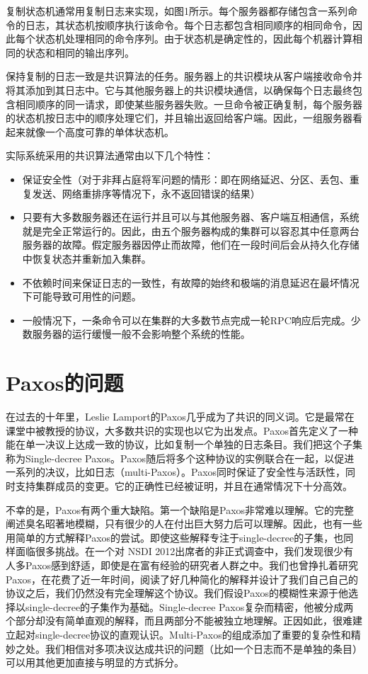 复制状态机通常用复制日志来实现，如图1所示。每个服务器都存储包含一系列命令的日志，其状态机按顺序执行该命令。每个日志都包含相同顺序的相同命令，因此每个状态机处理相同的命令序列。由于状态机是确定性的，因此每个机器计算相同的状态和相同的输出序列。

保持复制的日志一致是共识算法的任务。服务器上的共识模块从客户端接收命令并将其添加到其日志中。它与其他服务器上的共识模块通信，以确保每个日志最终包含相同顺序的同一请求，即使某些服务器失败。一旦命令被正确复制，每个服务器的状态机按日志中的顺序处理它们，并且输出返回给客户端。因此，一组服务器看起来就像一个高度可靠的单体状态机。

实际系统采用的共识算法通常由以下几个特性：

\begin{itemize}
    \item 保证安全性（对于非拜占庭将军问题的情形：即在网络延迟、分区、丢包、重复发送、网络重排序等情况下，永不返回错误的结果）
    \item 只要有大多数服务器还在运行并且可以与其他服务器、客户端互相通信，系统就是完全正常运行的。因此，由五个服务器构成的集群可以容忍其中任意两台服务器的故障。假定服务器因停止而故障，他们在一段时间后会从持久化存储中恢复状态并重新加入集群。
    \item 不依赖时间来保证日志的一致性，有故障的始终和极端的消息延迟在最坏情况下可能导致可用性的问题。
    \item 一般情况下，一条命令可以在集群的大多数节点完成一轮RPC响应后完成。少数服务器的运行缓慢一般不会影响整个系统的性能。
\end{itemize}

\chapter{Paxos的问题}
在过去的十年里，Leslie Lamport的Paxos几乎成为了共识的同义词。它是最常在课堂中被教授的协议，大多数共识的实现也以它为出发点。Paxos首先定义了一种能在单一决议上达成一致的协议，比如复制一个单独的日志条目。我们把这个子集称为Single-decree Paxos。Paxos随后将多个这种协议的实例联合在一起，以促进一系列的决议，比如日志（multi-Paxos）。Paxos同时保证了安全性与活跃性，同时支持集群成员的变更。它的正确性已经被证明，并且在通常情况下十分高效。

不幸的是，Paxos有两个重大缺陷。第一个缺陷是Paxos非常难以理解。它的完整阐述臭名昭著地模糊，只有很少的人在付出巨大努力后可以理解。因此，也有一些用简单的方式解释Paxos的尝试。即使这些解释专注于single-decree的子集，也同样面临很多挑战。在一个对 NSDI 2012出席者的非正式调查中，我们发现很少有人多Paxos感到舒适，即使是在富有经验的研究者人群之中。我们也曾挣扎着研究Paxos，在花费了近一年时间，阅读了好几种简化的解释并设计了我们自己自己的协议之后，我们仍然没有完全理解这个协议。我们假设Paxos的模糊性来源于他选择以single-decree的子集作为基础。Single-decree Paxos复杂而精密，他被分成两个部分却没有简单直观的解释，而且两部分不能被独立地理解。正因如此，很难建立起对single-decree协议的直观认识。Multi-Paxos的组成添加了重要的复杂性和精妙之处。我们相信对多项决议达成共识的问题（比如一个日志而不是单独的条目）可以用其他更加直接与明显的方式拆分。


